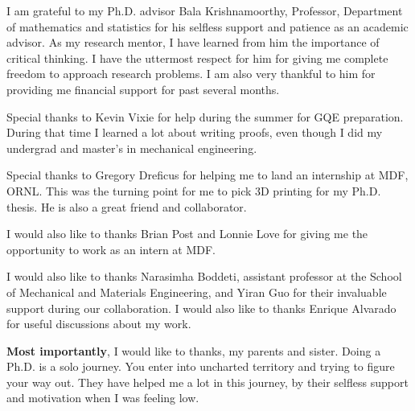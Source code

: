 I am grateful to my Ph.D. advisor Bala Krishnamoorthy, Professor,  Department of mathematics and statistics for his selfless support and patience as an academic advisor. As my research mentor, I have learned from him the importance of critical thinking. I have the uttermost respect for him for giving me complete freedom to approach research problems. I am also very thankful to him for providing me financial support for past several months.  

Special thanks to Kevin Vixie for help during the summer for GQE preparation. During that time I learned a lot about writing proofs, even though I did my undergrad and master's in mechanical engineering. 

Special thanks to Gregory Dreficus for helping me to land an internship at MDF, ORNL. This was the turning point for me to pick $3$D printing for my Ph.D. thesis. He is also a great friend and collaborator. 

I would also like to thanks Brian Post and Lonnie Love for giving me the opportunity to work as an intern at MDF. 

I would also like to thanks Narasimha Boddeti, assistant professor at the School of Mechanical and Materials Engineering, and Yiran Guo for their invaluable support during our collaboration.
I would also like to thanks Enrique Alvarado for useful discussions about my work.

\newpage
\textbf{Most importantly}, I would like to thanks, my parents and sister. Doing a Ph.D. is a solo journey. You enter into uncharted territory and trying to figure your way out. They have helped me a lot in this journey, by their selfless support and motivation when I was feeling low.
